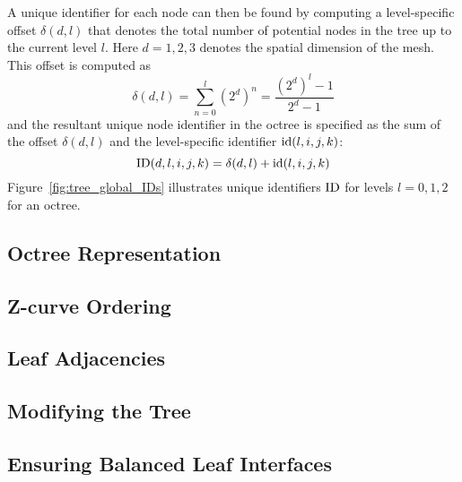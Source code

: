 

A unique identifier for each node can then be found by computing a
level-specific offset $\delta(d,l)$ that denotes the total number of potential
nodes in the tree up to the current level $l$. Here $d=1,2,3$ denotes the
spatial dimension of the mesh. This offset is computed as
%
\begin{equation}
\delta(d,l) = \sum_{n=0}^l (2^d)^n = \frac{(2^d)^l - 1}{2^d - 1}
\end{equation}
%
and the resultant unique node identifier in the octree is specified as the
sum of the offset $\delta(d,l)$ and the level-specific identifier
$\text{id}(l,i,j,k)$:
%
\begin{equation}
\text{ID}(d,l,i,j,k) = \delta(d,l) + \text{id}(l,i,j,k)
\end{equation}
%
Figure~\ref{fig:tree_global_IDs} illustrates unique identifiers $\text{ID}$ for
levels $l=0,1,2$ for an octree.

\subsection{Octree Representation}

\subsection{Z-curve Ordering}

\subsection{Leaf Adjacencies}

\subsection{Modifying the Tree}

\subsection{Ensuring Balanced Leaf Interfaces}
